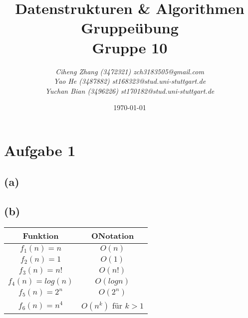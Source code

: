 \documentclass{article}
\begin{document}
\begin{titlepage}
    \title{\Huge \textbf{Datenstrukturen \& Algorithmen Gruppeübung\\Gruppe 10} }
    \author{\LARGE \textsl{Ciheng Zhang (3472321) zch3183505@gmail.com}\\\LARGE \textsl{Yao He (3487882) st168323@stud.uni-stuttgart.de}\\\LARGE \textsl{Yuchan Bian (3496226) st170182@stud.uni-stuttgart.de} \\[200pt]}
    \date{\today}
    \maketitle
    \thispagestyle{empty}
\end{titlepage}
\newpage
\section{Aufgabe 1}
\subsection*{(a)}
\begin{center}
\end{center}

\subsection*{(b)}
\begin{center}
    \begin{tabular}{|c|c|}
    \hline
    Funktion&ONotation\\
    \hline
    $f_1(n)=n$&$O(n)$\\
    \hline
    $f_2(n)=1$&$O(1)$\\
    \hline
    $f_3(n)=n!$&$O(n!)$\\
    \hline
    $f_4(n)=log(n)$&$O(log n)$\\
    \hline
    $f_5(n)=2^n$&$O(2^n)$\\
    \hline
    $f_6(n)=n^4$&$O(n^k)$ für $k>1$\\
    \hline
\end{tabular}

\end{center} 
\end{document}
